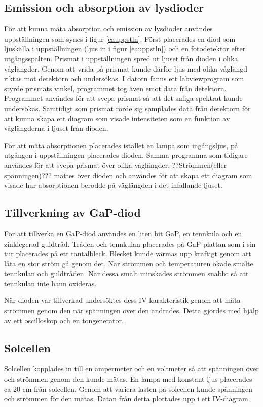 \documentclass[a4paper]{article}
\begin{document}
\subsection{Emission och absorption av lysdioder}
För att kunna mäta absorption och emission av lysdioder användes uppställningen som synes i figur \ref{eauppstln}. Först placerades en diod som ljuskälla i uppställningen (ljus in i figur \ref{eauppstln}) och en fotodetektor efter utgångsspalten. Prismat i uppställningen spred ut ljuset från dioden i olika våglängder. Genom att vrida på prismat kunde därför ljus med olika våglängd riktas mot detektorn och undersökas. I datorn fanns ett labviewprogram som styrde prismats vinkel, programmet tog även emot data från detektorn. Programmet användes för att svepa prismat så att det snliga spektrat kunde undersökas. Samtidigt som prismat rörde sig samplades data från detektorn för att kunna skapa ett diagram som visade intensiteten som en funktion av våglängderna i ljuset från dioden. 

För att mäta absorptionen placerades istället en lampa som ingångsljus, på utgången i uppställningen placerades dioden. Samma programma som tidigare användes för att svepa prismat över olika våglängder. ??Strömmen(eller spänningen)??? mättes över dioden och användes för att skapa ett diagram som visade hur absorptionen berodde på väglängden i det infallande ljuset. 

\subsection{Tillverkning av GaP-diod}
För att tillverka en GaP-diod användes en liten bit GaP, en tennkula och en zinklegerad guldtråd. Tråden och tennkulan placerades på GaP-plattan som i sin tur placerades på ett tantalbleck. Blecket kunde värmas upp kraftigt genom att låta en stor ström gå genom det. När strömmen och temperaturen ökade smälte tennkulan och guldtråden. När dessa smält minskades strömmen snabbt så att tennkulan inte hann oxideras.

När dioden var tillverkad undersöktes dess IV-karakteristik genom att mäta strömmen genom den när spänningen över den ändrades. Detta gjordes med hjälp av ett oscilloskop och en tongenerator. 

\subsection{Solcellen}
Solcellen kopplades in till en ampermeter och en voltmeter så att spänningen över och strömmen genom den kunde mätas. En lampa med konstant ljus placerades ca 20 cm från solcellen. Genom att variera lasten på solcellen kunde spänningen och strömmen för den mätas. Datan från detta plottades upp i ett IV-diagram. 
\end{document}
